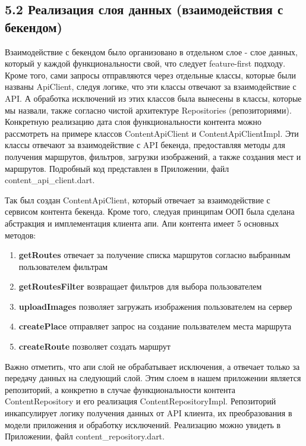 \subsection*{5.2 Реализация слоя данных (взаимодействия с бекендом)}
Взаимодействие с бекендом было организовано в отдельном слое - слое данных, который у каждой функциональности свой, что следует feature-first подходу. Кроме того, сами запросы отправляются через отдельные классы, которые были названы ApiClient, следуя логике, что эти классы отвечают за взаимодействие с API. А обработка исключений из этих классов была вынесены в классы, которые мы назвали, также согласно чистой архитектуре Repositories (репозиториями). Конкретную реализацию дата слоя функциональности контента можно рассмотреть на примере классов ContentApiClient и ContentApiClientImpl. Эти классы отвечают за взаимодействие с API бекенда, предоставляя методы для получения маршрутов, фильтров, загрузки изображений, а также создания мест и маршрутов. Подробный код представлен в Приложении, файл content\_api\_client.dart.

Так был создан ContentApiClient, который отвечает за взаимодействие с сервисом контента бекенда. Кроме того, следуая принципам ООП была сделана абстракция и имплементация клиента апи. Апи контента имеет 5 основных методов:

\begin{enumerate}
    \item \textbf{getRoutes} отвечает за получение списка маршрутов согласно выбранным пользователем фильтрам
    \item \textbf{getRoutesFilter} возвращает фильтров для выбора пользователем
    \item \textbf{uploadImages} позволяет загружать изображения пользователем на сервер
    \item \textbf{createPlace} отправляет запрос на создание пользвателем места маршрута
    \item \textbf{createRoute} позволяет создать маршрут
\end{enumerate}

\noindent Важно отметить, что апи слой не обрабатывает исключения, а отвечает только за передачу данных на следующий слой. Этим слоем в нашем приложении является репозиторий, а конкретно в случае функциональности контента ContentRepository и его реализация ContentRepositoryImpl. Репозиторий инкапсулирует логику получения данных от API клиента, их преобразования в модели приложения и обработку исключений. Реализацию можно увидеть в Приложении, файл content\_repository.dart.

